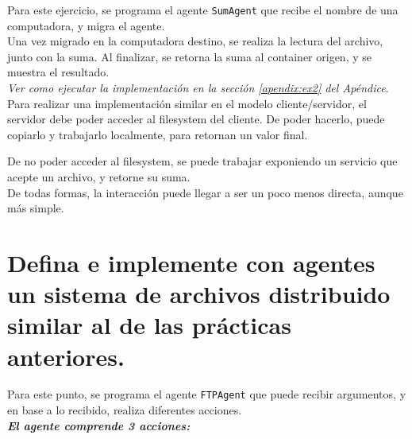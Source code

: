 \documentclass[osajnl,twocolumn,showpacs,superscriptaddress,10pt]{revtex4-1} %
\begin{document}
Para este ejercicio, se programa el agente \texttt{SumAgent} que recibe el nombre de una computadora, y migra el agente. \\

Una vez migrado en la computadora destino, se realiza la lectura del archivo, junto con la suma.
Al finalizar, se retorna la suma al container origen, y se muestra el resultado. \\

\textit{Ver como ejecutar la implementación en la sección \ref{apendix:ex2} del Apéndice}. \\

Para realizar una implementación similar en el modelo cliente/servidor, el servidor debe poder acceder
al filesystem del cliente. De poder hacerlo, puede copiarlo y trabajarlo localmente, para retornan un valor final.

De no poder acceder al filesystem, se puede trabajar exponiendo un servicio que acepte un archivo, y retorne su suma. \\

De todas formas, la interacción puede llegar a ser un poco menos directa, aunque más simple.

\section{Defina  e  implemente  con  agentes  un  sistema  de  archivos distribuido  similar  al  de  las prácticas anteriores.}

Para este punto, se programa el agente \texttt{FTPAgent} que puede recibir argumentos, y en base a lo recibido, realiza diferentes acciones. \\

\textit{\textbf{El agente comprende 3 acciones:}}
\end{document}
